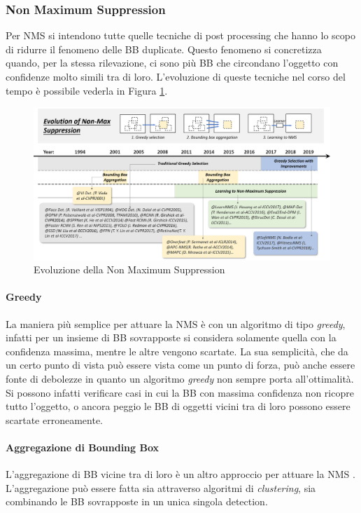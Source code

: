 \subsubsection{Non Maximum Suppression}
Per \ac{NMS} si intendono tutte quelle tecniche di post processing che hanno lo scopo di ridurre il fenomeno delle \ac{BB} duplicate. Questo fenomeno si concretizza quando, per la stessa rilevazione, ci sono più \ac{BB} che circondano l'oggetto con confidenze molto simili tra di loro. L'evoluzione di queste tecniche nel corso del tempo è possibile vederla in Figura \ref{fig:NMS_history}. 
\begin{figure}
    \centering
    \includegraphics[width=\textwidth]{images/evol-nms.png}
    \caption{Evoluzione della Non Maximum Suppression \cite{DBLP:journals/corr/abs-1905-05055}}
    \label{fig:NMS_history}
\end{figure}


\paragraph{Greedy}
La maniera più semplice per attuare la \ac{NMS} è con un algoritmo di tipo \textit{greedy}, infatti per un insieme di \ac{BB} sovrapposte si considera solamente quella con la confidenza massima, mentre le altre vengono scartate. La sua semplicità, che da un certo punto di vista può essere vista come un punto di forza, può anche essere fonte di debolezze in quanto un algoritmo \textit{greedy} non sempre porta all'ottimalità. Si possono infatti verificare casi in cui la \ac{BB} con massima confidenza non ricopre tutto l'oggetto, o ancora peggio le \ac{BB} di oggetti vicini tra di loro possono essere scartate erroneamente.


\paragraph{Aggregazione di Bounding Box}
L'aggregazione di \ac{BB} vicine tra di loro è un altro approccio per attuare la \ac{NMS} \cite{viola2001rapid, sermanet2013overfeat, rothe2014non, mrowca2015spatial}. L'aggregazione può essere fatta sia attraverso algoritmi di \textit{clustering}, sia combinando le \ac{BB} sovrapposte in un unica singola detection. 


